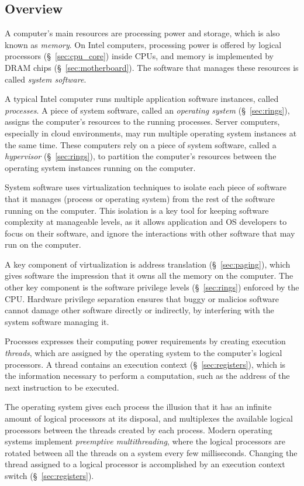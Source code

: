 \subsection{Overview}
\label{sec:background_overview}

A computer's main resources are processing power and storage, which is also
known as \textit{memory}. On Intel computers, processing power is offered by
logical processors (\S~\ref{sec:cpu_core}) inside CPUs, and memory is
implemented by DRAM chips (\S~\ref{sec:motherboard}). The software that manages
these resources is called \textit{system software}.

A typical Intel computer runs multiple application software instances, called
\textit{processes}. A piece of system software, called an
\textit{operating system} (\S~\ref{sec:rings}), assigns the computer's
resources to the running processes. Server computers, especially in cloud
environments, may run multiple operating system instances at the same time.
These computers rely on a piece of system software, called a
\textit{hypervisor} (\S~\ref{sec:rings}), to partition the computer's resources
between the operating system instances running on the computer.

System software uses virtualization techniques to isolate each piece of
software that it manages (process or operating system) from the rest of the
software running on the computer. This isolation is a key tool for keeping
software complexity at manageable levels, as it allows application and OS
developers to focus on their software, and ignore the interactions with other
software that may run on the computer.

A key component of virtualization is address translation (\S~\ref{sec:paging}),
which gives software the impression that it owns all the memory on the
computer. The other key component is the software privilege levels
(\S~\ref{sec:rings}) enforced by the CPU. Hardware privilege separation ensures
that buggy or malicios software cannot damage other software directly or
indirectly, by interfering with the system software managing it.

Processes expresses their computing power requirements by creating execution
\textit{threads}, which are assigned by the operating system to the computer's
logical processors. A thread contains an execution context
(\S~\ref{sec:registers}), which is the information necessary to perform a
computation, such as the address of the next instruction to be executed.

The operating system gives each process the illusion that it has an
infinite amount of logical processors at its disposal, and multiplexes the
available logical processors between the threads created by each process.
Modern operating systems implement \textit{preemptive multithreading}, where
the logical processors are rotated between all the threads on a system every
few milliseconds. Changing the thread assigned to a logical processor is
accomplished by an execution context switch (\S~\ref{sec:registers}).

